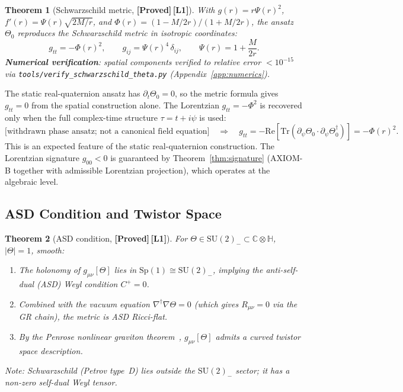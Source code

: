 \documentclass[12pt,a4paper]{article}
\newtheorem{theorem}{Theorem}[section]
\theoremstyle{definition}
\theoremstyle{remark}
\newcommand{\PROVED}{\textbf{[Proved]}}
\newcommand{\Lone}{\textbf{[L1]}}
\newcommand{\CC}{\mathbb{C}}
\newcommand{\HH}{\mathbb{H}}
\newcommand{\Tr}{\mathrm{Tr}}
\newcommand{\re}{\mathrm{Re}}
\begin{document}
\begin{theorem}[Schwarzschild metric, \PROVED\,\Lone]
\label{thm:schwarzschild}
With $g(r) = r\Psi(r)^2$,
$f'(r) = \Psi(r)\sqrt{2M/r}$,
and $\Phi(r) = (1-M/2r)/(1+M/2r)$,
the ansatz $\Theta_0$ reproduces the Schwarzschild metric in isotropic
coordinates:
\[
  g_{tt} = -\Phi(r)^2, \qquad
  g_{ij} = \Psi(r)^4\,\delta_{ij}, \qquad
  \Psi(r) = 1 + \frac{M}{2r}.
\]
\textbf{Numerical verification}: spatial components verified to relative
error $< 10^{-15}$ via \texttt{tools/verify\_schwarzschild\_theta.py}
(Appendix~\ref{app:numerics}).
\end{theorem}

\begin{tcolorbox}[colback=orange!5!white,colframe=orange!50!black,
  title={Complex-time structure and the temporal component}]
The static real-quaternion ansatz has $\partial_t\Theta_0 = 0$, so the metric
formula gives $g_{tt} = 0$ from the spatial construction alone.
The Lorentzian $g_{tt} = -\Phi^2$ is recovered only when the full
complex-time structure $\tau = t + i\psi$ is used:
\[
  \text{[withdrawn phase ansatz; not a canonical field equation]}
  \quad\Longrightarrow\quad
  g_{tt} = -\re[\Tr(\partial_\psi\Theta_0 \cdot \partial_\psi\Theta_0^\dagger)]
          = -\Phi(r)^2.
\]
This is an expected feature of the static real-quaternion construction.
The Lorentzian signature $g_{00} < 0$ is guaranteed by
Theorem~\ref{thm:signature} (AXIOM-B together with admissible Lorentzian projection), which operates at the algebraic level.
\end{tcolorbox}

\subsection{ASD Condition and Twistor Space}

\begin{theorem}[ASD condition, \PROVED\,\Lone]
\label{thm:asd}
For $\Theta \in \mathrm{SU}(2)_- \subset \CC\otimes\HH$, $|\Theta| = 1$,
smooth:
\begin{enumerate}
  \item The holonomy of $g_{\mu\nu}[\Theta]$ lies in
        $\mathrm{Sp}(1) \cong \mathrm{SU}(2)_-$, implying the anti-self-dual
        (ASD) Weyl condition $C^+ = 0$.
  \item Combined with the vacuum equation $\nabla^\dagger\nabla\Theta = 0$
        (which gives $R_{\mu\nu} = 0$ via the GR chain), the metric is
        ASD Ricci-flat.
  \item By the Penrose nonlinear graviton theorem~\cite{penrose1976},
        $g_{\mu\nu}[\Theta]$ admits a curved twistor space description.
\end{enumerate}
\emph{Note}: Schwarzschild (Petrov type~D) lies outside the $\mathrm{SU}(2)_-$
sector; it has a non-zero self-dual Weyl tensor.
\end{theorem}
\end{document}
